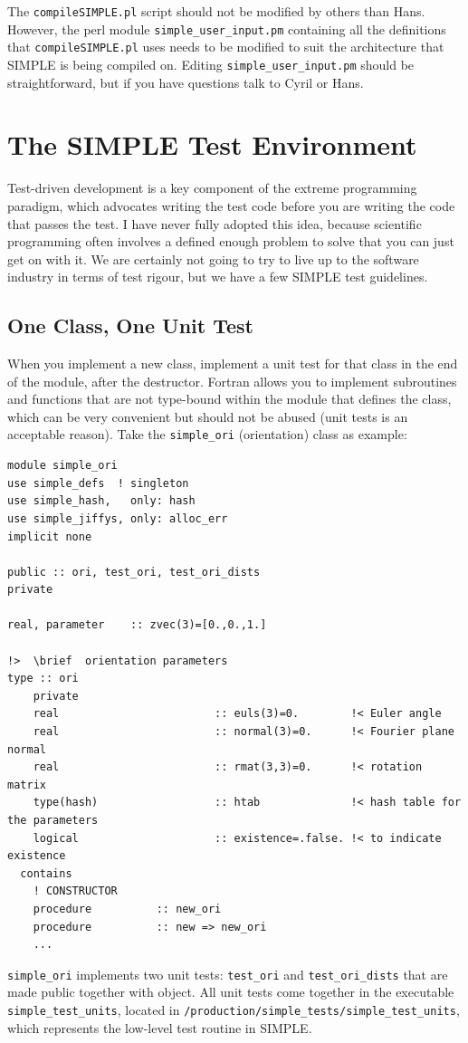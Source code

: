 \documentclass[a4paper,11pt]{article}
\begin{document}
The \texttt{compileSIMPLE.pl} script should not be modified by others than Hans. However, the perl module \texttt{simple\_user\_input.pm} containing all the definitions that \texttt{compileSIMPLE.pl} uses needs to be modified to suit the architecture that SIMPLE is being compiled on. Editing \texttt{simple\_user\_input.pm} should be straightforward, but if you have questions talk to Cyril or Hans.

\section{The SIMPLE Test Environment}
Test-driven development is a key component of the extreme programming paradigm, which advocates writing the test code before you are writing the code that passes the test. I have never fully adopted this idea, because scientific programming often involves a defined enough problem to solve that you can just get on with it. We are certainly not going to try to live up to the software industry in terms of test rigour, but we have a few SIMPLE test guidelines. 

\subsection{One Class, One Unit Test}
When you implement a new class, implement a unit test for that class in the end of the module, after the destructor. Fortran allows you to implement subroutines and functions that are not type-bound within the module that defines the class, which can be very convenient but should not be abused (unit tests is an acceptable reason). Take the \texttt{simple\_ori} (orientation) class as example:
\begin{verbatim}
module simple_ori
use simple_defs  ! singleton
use simple_hash,   only: hash
use simple_jiffys, only: alloc_err
implicit none

public :: ori, test_ori, test_ori_dists
private

real, parameter    :: zvec(3)=[0.,0.,1.]

!>  \brief  orientation parameters
type :: ori
    private
    real                        :: euls(3)=0.        !< Euler angle
    real                        :: normal(3)=0.      !< Fourier plane normal
    real                        :: rmat(3,3)=0.      !< rotation matrix
    type(hash)                  :: htab              !< hash table for the parameters
    logical                     :: existence=.false. !< to indicate existence
  contains
    ! CONSTRUCTOR
    procedure          :: new_ori
    procedure          :: new => new_ori
    ...
\end{verbatim}
\texttt{simple\_ori} implements two unit tests: \texttt{test\_ori} and \texttt{test\_ori\_dists} that are made public together with object. All unit tests come together in the executable \texttt{simple\_test\_units}, located in  \texttt{/production/simple\_tests/simple\_test\_units}, which represents the low-level test routine in SIMPLE. 
\end{document}
